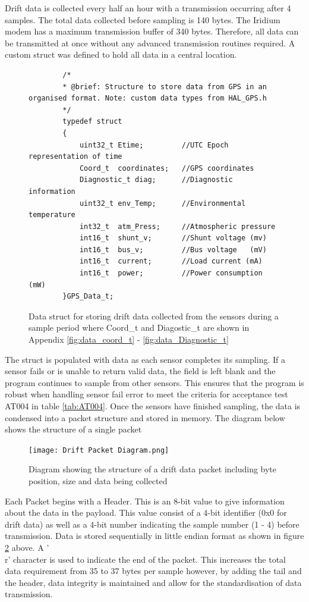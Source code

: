 Drift data is collected every half an hour with a transmission occurring after 4 samples. The total data collected before sampling is 140 bytes. The Iridium modem has a maximum transmission buffer of 340 bytes. Therefore, all data can be transmitted at once without any advanced transmission routines required. A custom struct was defined to hold all data in a central location.

\begin{figure}[H]
	\centering
	\begin{lstlisting}
		/*
		* @brief: Structure to store data from GPS in an organised format. Note: custom data types from HAL_GPS.h
		*/
		typedef struct
		{
			uint32_t Etime;			//UTC Epoch representation of time
			Coord_t  coordinates;	//GPS coordinates
			Diagnostic_t diag;		//Diagnostic information
			uint32_t env_Temp;		//Environmental temperature
			int32_t  atm_Press;		//Atmospheric pressure
			int16_t  shunt_v;       //Shunt voltage (mv)
			int16_t  bus_v;			//Bus voltage   (mV)
			int16_t  current;       //Load current (mA)
			int16_t  power;			//Power consumption (mW)
		}GPS_Data_t;
	\end{lstlisting}
	\caption{Data struct for storing drift data collected from the sensors during a sample period where Coord\_t and Diagostic\_t are shown in Appendix \ref{fig:data_coord_t} - \ref{fig:data_Diagnostic_t}} 
	\label{fig:data_drift_struct}
\end{figure}

The struct is populated with data as each sensor completes its sampling. If a sensor fails or is unable to return valid data, the field is left blank and the program continues to sample from other sensors. This ensures that the program is robust when handling sensor fail error to meet the criteria for acceptance test AT004 in table \ref{tab:AT004}. Once the sensors have finished sampling, the data is condensed into a packet structure and stored in memory. The diagram below shows the structure of a single packet

\begin{figure}[H]
	\centering
	\texttt{[image: Drift Packet Diagram.png]}
	\caption{Diagram showing the structure of a drift data packet including byte position, size and data being collected}
	\label{fig:packet_structure}
\end{figure}

Each Packet begins with a Header. This is an 8-bit value to give information about the data in the payload. This value consist of a 4-bit identifier (0x0 for drift data) as well as a 4-bit number indicating the sample number (1 - 4) before transmission. Data is stored sequentially in little endian format as shown in figure \ref{fig:packet_structure} above. A '\\r' character is used to indicate the end of the packet. This increases the total data requirement from 35 to 37 bytes per sample however, by adding the tail and the header, data integrity is maintained and allow for the standardisation of data transmission.\par  

